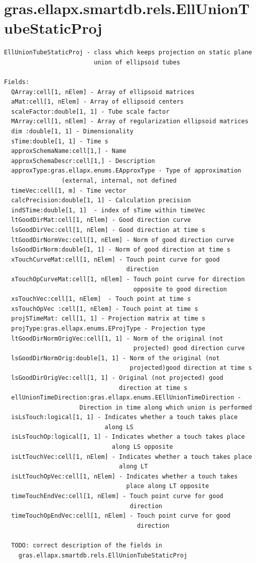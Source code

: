 \documentclass[letterpaper,10pt,english]{sphinxmanual}
\begin{document}
\section{gras.ellapx.smartdb.rels.EllUnionTubeStaticProj}
\label{chap_func:gras-ellapx-smartdb-rels-elluniontubestaticproj}
\begin{Verbatim}[commandchars=\\\{\}]
EllUnionTubeStaticProj - class which keeps projection on static plane
                         union of ellipsoid tubes

Fields:
  QArray:cell[1, nElem] - Array of ellipsoid matrices
  aMat:cell[1, nElem] - Array of ellipsoid centers
  scaleFactor:double[1, 1] - Tube scale factor
  MArray:cell[1, nElem] - Array of regularization ellipsoid matrices
  dim :double[1, 1] - Dimensionality
  sTime:double[1, 1] - Time s
  approxSchemaName:cell[1,] - Name
  approxSchemaDescr:cell[1,] - Description
  approxType:gras.ellapx.enums.EApproxType - Type of approximation
                (external, internal, not defined
  timeVec:cell[1, m] - Time vector
  calcPrecision:double[1, 1] - Calculation precision
  indSTime:double[1, 1]  - index of sTime within timeVec
  ltGoodDirMat:cell[1, nElem] - Good direction curve
  lsGoodDirVec:cell[1, nElem] - Good direction at time s
  ltGoodDirNormVec:cell[1, nElem] - Norm of good direction curve
  lsGoodDirNorm:double[1, 1] - Norm of good direction at time s
  xTouchCurveMat:cell[1, nElem] - Touch point curve for good
                                  direction
  xTouchOpCurveMat:cell[1, nElem] - Touch point curve for direction
                                    opposite to good direction
  xsTouchVec:cell[1, nElem]  - Touch point at time s
  xsTouchOpVec :cell[1, nElem] - Touch point at time s
  projSTimeMat: cell[1, 1] - Projection matrix at time s
  projType:gras.ellapx.enums.EProjType - Projection type
  ltGoodDirNormOrigVec:cell[1, 1] - Norm of the original (not
                                    projected) good direction curve
  lsGoodDirNormOrig:double[1, 1] - Norm of the original (not
                                   projected)good direction at time s
  lsGoodDirOrigVec:cell[1, 1] - Original (not projected) good
                                direction at time s
  ellUnionTimeDirection:gras.ellapx.enums.EEllUnionTimeDirection -
                     Direction in time along which union is performed
  isLsTouch:logical[1, 1] - Indicates whether a touch takes place
                            along LS
  isLsTouchOp:logical[1, 1] - Indicates whether a touch takes place
                              along LS opposite
  isLtTouchVec:cell[1, nElem] - Indicates whether a touch takes place
                                along LT
  isLtTouchOpVec:cell[1, nElem] - Indicates whether a touch takes
                                  place along LT opposite
  timeTouchEndVec:cell[1, nElem] - Touch point curve for good
                                   direction
  timeTouchOpEndVec:cell[1, nElem] - Touch point curve for good
                                     direction

  TODO: correct description of the fields in
    gras.ellapx.smartdb.rels.EllUnionTubeStaticProj
\end{Verbatim}
\end{document}
